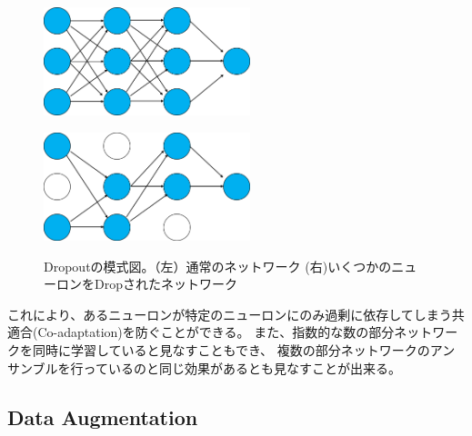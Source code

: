 
\begin{figure}[tbp]
    \label{fig:dropout_network}
    \begin{minipage}{0.5\hsize}
     \begin{center}
      \includegraphics[width=60mm]{figures/standard_network.png}
     \end{center}
     \label{fig:one}
    \end{minipage}
    \begin{minipage}{0.5\hsize}
     \begin{center}
      \includegraphics[width=60mm]{figures/dropout_network.png}
     \end{center}
     \label{fig:two}
    \end{minipage}
    \caption{Dropoutの模式図。（左）通常のネットワーク (右)いくつかのニューロンをDropされたネットワーク}
    
\end{figure}

これにより、あるニューロンが特定のニューロンにのみ過剰に依存してしまう共適合(Co-adaptation)を防ぐことができる。
また、指数的な数の部分ネットワークを同時に学習していると見なすこともでき、
複数の部分ネットワークのアンサンブルを行っているのと同じ効果があるとも見なすことが出来る。

\subsection{Data Augmentation}


